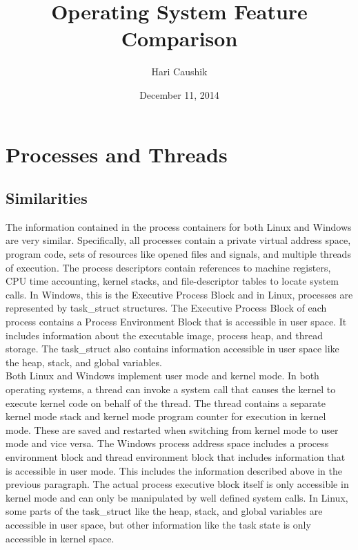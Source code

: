 \documentclass[letterpaper,10pt,titlepage]{article}
\title{Operating System Feature Comparison}
\date{December 11, 2014}
\author{Hari Caushik}
\begin{document}
\maketitle
\thispagestyle{empty}
\newpage

\tableofcontents
\newpage

\section{Processes and Threads}
\subsection{Similarities}
The information contained in the process containers for both Linux and Windows
are very similar. Specifically, all processes contain a private virtual 
address space, program code, sets of resources like opened files and signals,
and multiple threads of execution. The process descriptors contain references
to machine registers, CPU time accounting, kernel stacks, and file-descriptor
tables to locate system calls. In Windows, this is the Executive Process Block
and in Linux, processes are represented by task\_struct structures. The 
Executive Process Block of each process contains a Process Environment Block 
that is accessible in user space. It includes information about the executable
image, process heap, and thread storage. The task\_struct also contains 
information accessible in user space like the heap, stack, and global
variables.
\\
\linebreak
Both Linux and Windows implement user mode and kernel mode. In both operating
systems, a thread can invoke a system call that causes the kernel to execute
kernel code on behalf of the thread. The thread contains a separate kernel 
mode stack and kernel mode program counter for execution in kernel mode. These
are saved and restarted when switching from kernel mode to user mode and vice
versa. The Windows process address space includes a process environment block
and thread environment block that includes information that is accessible in
user mode. This includes the information described above in the previous
paragraph. The actual process executive block itself is only accessible in 
kernel mode and can only be manipulated by well defined system calls. In Linux,
some parts of the task\_struct like the heap, stack, and global variables are
accessible in user space, but other information like the task state is only
accessible in kernel space. 
\\
\end{document}
